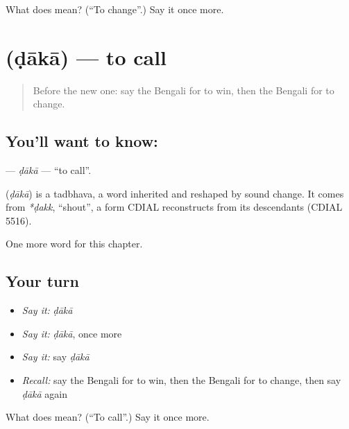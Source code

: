 \begin{tcolorbox}[breakable,colback=teal!4,colframe=teal!35!black,title={Before you move on}]
What does  mean? (\textquotedblleft{}To change\textquotedblright{}.) Say it once more.
\end{tcolorbox}
\section[\texorpdfstring{\bn{ডাকা} (ḍākā)}{ডাকা (ḍākā)}]{ (ḍākā) — to call}

\label{lesson:BN-C55-daka}



\begin{quote}
Before the new one: say the Bengali for to win, then the Bengali for to change.
\end{quote}

\subsection*{You'll want to know: }
\textbf{} — \emph{ḍākā} — \textquotedblleft{}to call\textquotedblright{}.

\begin{cousinweb}
\textbf{} (\emph{ḍākā}) is a tadbhava, a word inherited and reshaped by sound change. It comes from \emph{*ḍakk}, \textquotedblleft{}shout\textquotedblright{}, a form CDIAL reconstructs from its descendants (CDIAL 5516).
\end{cousinweb}

\begin{grammarlens}[title={What you've built}]
One more word for this chapter.
\end{grammarlens}

\subsection*{Your turn}
\begin{itemize}
\raggedright
  \item \emph{Say it:} \emph{ḍākā}
  \item \emph{Say it:} \emph{ḍākā}, once more
  \item \emph{Say it:} say \emph{ḍākā}
  \item \emph{Recall:} say the Bengali for to win, then the Bengali for to change, then say \emph{ḍākā} again
\end{itemize}

\begin{tcolorbox}[breakable,colback=teal!4,colframe=teal!35!black,title={Before you move on}]
What does  mean? (\textquotedblleft{}To call\textquotedblright{}.) Say it once more.
\end{tcolorbox}
